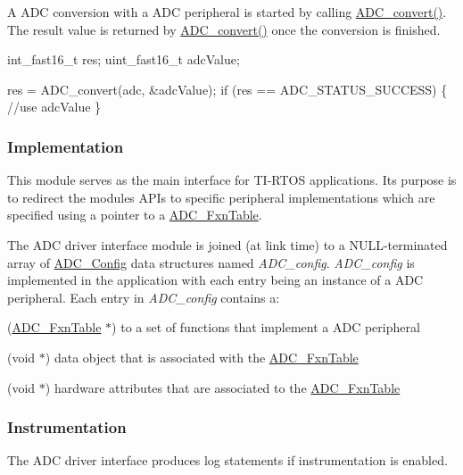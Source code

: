 A A\+D\+C conversion with a A\+D\+C peripheral is started by calling \hyperlink{_a_d_c_8h_afcac5582b8be42a7740091d150aef05c}{A\+D\+C\+\_\+convert()}. The result value is returned by \hyperlink{_a_d_c_8h_afcac5582b8be42a7740091d150aef05c}{A\+D\+C\+\_\+convert()} once the conversion is finished.


\begin{DoxyCode}
int\_fast16\_t res;
uint\_fast16\_t adcValue;

res = ADC_convert(adc, &adcValue);
\textcolor{keywordflow}{if} (res == ADC_STATUS_SUCCESS) \{
    \textcolor{comment}{//use adcValue}
\}
\end{DoxyCode}


\subsubsection*{Implementation}

This module serves as the main interface for T\+I-\/\+R\+T\+O\+S applications. Its purpose is to redirect the module\textquotesingle{}s A\+P\+Is to specific peripheral implementations which are specified using a pointer to a \hyperlink{struct_a_d_c___fxn_table}{A\+D\+C\+\_\+\+Fxn\+Table}.

The A\+D\+C driver interface module is joined (at link time) to a N\+U\+L\+L-\/terminated array of \hyperlink{struct_a_d_c___config}{A\+D\+C\+\_\+\+Config} data structures named {\itshape A\+D\+C\+\_\+config}. {\itshape A\+D\+C\+\_\+config} is implemented in the application with each entry being an instance of a A\+D\+C peripheral. Each entry in {\itshape A\+D\+C\+\_\+config} contains a\+:
\begin{DoxyItemize}
\item (\hyperlink{struct_a_d_c___fxn_table}{A\+D\+C\+\_\+\+Fxn\+Table} $\ast$) to a set of functions that implement a A\+D\+C peripheral
\item (void $\ast$) data object that is associated with the \hyperlink{struct_a_d_c___fxn_table}{A\+D\+C\+\_\+\+Fxn\+Table}
\item (void $\ast$) hardware attributes that are associated to the \hyperlink{struct_a_d_c___fxn_table}{A\+D\+C\+\_\+\+Fxn\+Table}
\end{DoxyItemize}

\subsubsection*{Instrumentation}

The A\+D\+C driver interface produces log statements if instrumentation is enabled.

